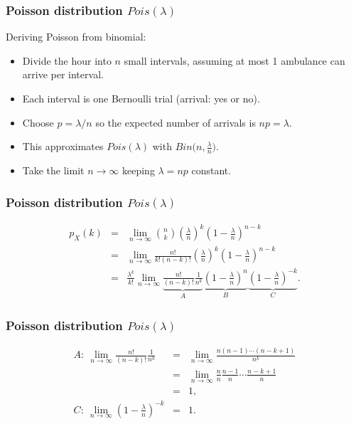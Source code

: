 \documentclass[t,8pt]{beamer}
\begin{document}
\begin{frame}
	\frametitle{Poisson distribution $Pois(\lambda)$}
	Deriving Poisson from binomial:
	\begin{itemize}
		\item Divide the hour into $n$ small intervals, assuming at most 1 ambulance can arrive per interval.
		\item Each interval is one Bernoulli trial (arrival: yes or no).
		\item Choose $p=\lambda/n$ so the expected number of arrivals is $np=\lambda$.
		\item This approximates $Pois(\lambda)$ with $Bin\big(n,\frac{\lambda}{n}\big)$.
		\item Take the limit $n\rightarrow\infty$ keeping $\lambda=np$ constant.
	\end{itemize}
\end{frame}

\begin{frame}
	\frametitle{Poisson distribution $Pois(\lambda)$}
	\begin{eqnarray*}
		p_X(k)
		&=&\lim_{n\rightarrow\infty}
		{n\choose k}\left(\frac{\lambda}{n}\right)^k
		\left(1-\frac{\lambda}{n}\right)^{n-k}\\
		&=&\lim_{n\rightarrow\infty}
		\frac{n!}{k!(n-k)!}\left(\frac{\lambda}{n}\right)^k
		\left(1-\frac{\lambda}{n}\right)^{n-k}\\
		&=&\frac{\lambda^k}{k!}
		\lim_{n\rightarrow\infty}
		\underbrace{\frac{n!}{(n-k)!}\frac{1}{n^k}}_{A}
		\underbrace{\left(1-\frac{\lambda}{n}\right)^n}_{B}
		\underbrace{\left(1-\frac{\lambda}{n}\right)^{-k}}_{C}.
	\end{eqnarray*}
\end{frame}

\begin{frame}
	\frametitle{Poisson distribution $Pois(\lambda)$}
	\begin{eqnarray*}
		A:\ \lim_{n\rightarrow\infty}\frac{n!}{(n-k)!}\frac{1}{n^k}
		&=&\lim_{n\rightarrow\infty}
		\frac{n(n-1)\cdots(n-k+1)}{n^k}\\
		&=&\lim_{n\rightarrow\infty}
		\frac{n}{n}\frac{n-1}{n}\cdots\frac{n-k+1}{n}\\
		&=&1,\\[6pt]
		C:\ \lim_{n\rightarrow\infty}\left(1-\frac{\lambda}{n}\right)^{-k}
		&=&1.
	\end{eqnarray*}
\end{frame}
\end{document}

